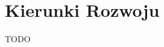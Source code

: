 \documentclass[../main.tex]{subfiles}
\begin{document}
	
	
\section{Kierunki Rozwoju}

TODO
\end{document}
